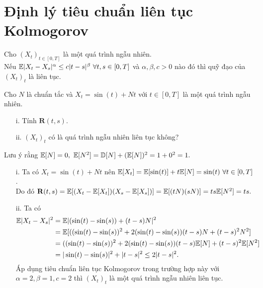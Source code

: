 \section{Định lý tiêu chuẩn liên tục Kolmogorov}
\begin{thm}
    Cho $(X_t)_{t \in [0, T]}$ là một quá trình ngẫu nhiên. \\
    Nếu $\mathbb{E}|X_t-X_s|^{\alpha} \leq c|t-s|^{\beta}~\forall t,s \in[0, T]$ và $\alpha, \beta, c > 0$ nào đó thì quỹ đạo của $(X_t)_t$ là liên tục.
\end{thm}
\begin{exam*}
Cho $N$ là \bnn chuẩn tắc và $X_t = \sin(t) + Nt$ với $t\in [0, T]$ là một quá trình ngẫu nhiên.
\begin{itemize}
    \item[i.] Tính $\mathbf{R}(t,s).$
    \item[ii.] $(X_t)_t$ có là quá trình ngẫu nhiên liên tục không?
\end{itemize}
\end{exam*}
\begin{sol*}
Lưu ý rằng $\mathbb{E}[N] = 0,~\mathbb{E}[N^2] = \mathbb{D}[N]+(\mathbb{E}[N])^2=1+0^2=1.$
\begin{itemize}
    \item[i.] Ta có $X_t = \sin(t) + Nt$ nên $\mathbb{E}[X_t]=\mathbb{E}[\sin(t)]+t\mathbb{E}[N]=\sin(t)~\forall t \in [0, T]$.\\
    Do đó $\mathbf{R}(t,s) = \mathbb{E}[(X_t - \mathbb{E}[X_t])(X_s - \mathbb{E}[X_s])] = \mathbb{E}[(tN)(sN)]=ts\mathbb{E}[N^2]=ts.$
    \item[ii.] Ta có 
    \begin{align*}
        \mathbb{E}|X_t-X_s|^2 &= \mathbb{E}|(\sin(t)-\sin(s))+(t-s)N|^2\\
        &=\mathbb{E}[((\sin(t)-\sin(s))^2+2(\sin(t)-\sin(s))(t-s)N+(t-s)^2N^2]\\
        &=((\sin(t)-\sin(s))^2+2(\sin(t)-\sin(s))(t-s)\mathbb{E}[N]+(t-s)^2\mathbb{E}[N^2]\\
        &= |\sin(t)-\sin(s)|^2+|t-s|^2 \leq 2|t-s|^2.
    \end{align*}
    Áp dụng tiêu chuẩn liên tục Kolmogorov trong trường hợp này với $\alpha = 2, \beta = 1, c = 2$ thì $(X_t)_t$ là một quá trình ngẫu nhiên liên tục.
\end{itemize}
\end{sol*}
